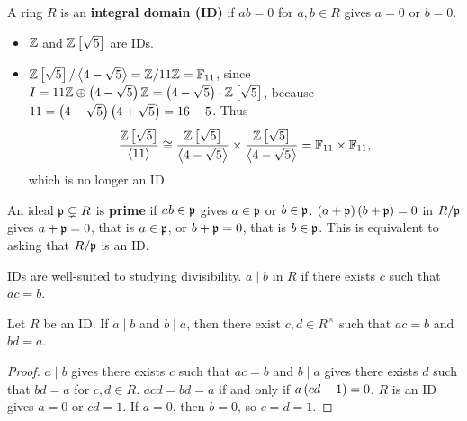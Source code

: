 
\begin{definition}
A ring $ R $ is an \textbf{integral domain (ID)} if $ ab = 0 $ for $ a, b \in R $ gives $ a = 0 $ or $ b = 0 $.
\end{definition}

\begin{example*}
\hfill
\begin{itemize}
\item $ \mathbb{Z} $ and $ \mathbb{Z}\left[ \sqrt{5} \right] $ are IDs.
\item $ \mathbb{Z}\left[ \sqrt{5} \right] / \left\langle 4 - \sqrt{5} \right\rangle = \mathbb{Z} / 11\mathbb{Z} = \mathbb{F}_{11} $, since $ I = 11\mathbb{Z} \oplus \left( 4 - \sqrt{5} \right)\mathbb{Z} = \left( 4 - \sqrt{5} \right) \cdot \mathbb{Z}\left[ \sqrt{5} \right] $, because $ 11 = \left( 4 - \sqrt{5} \right)\left( 4 + \sqrt{5} \right) = 16 - 5 $. Thus
$$ \dfrac{\mathbb{Z}\left[ \sqrt{5} \right]}{\left\langle 11 \right\rangle} \cong \dfrac{\mathbb{Z}\left[ \sqrt{5} \right]}{\left\langle 4 - \sqrt{5} \right\rangle} \times \dfrac{\mathbb{Z}\left[ \sqrt{5} \right]}{\left\langle 4 - \sqrt{5} \right\rangle} = \mathbb{F}_{11} \times \mathbb{F}_{11}, $$
which is no longer an ID.
\end{itemize}
\end{example*}

\begin{remark*}
An ideal $ \mathfrak{p} \subsetneq R $ is \textbf{prime} if $ ab \in \mathfrak{p} $ gives $ a \in \mathfrak{p} $ or $ b \in \mathfrak{p} $. $ \left( a + \mathfrak{p} \right)\left( b + \mathfrak{p} \right) = 0 $ in $ R / \mathfrak{p} $ gives $ a + \mathfrak{p} = 0 $, that is $ a \in \mathfrak{p} $, or $ b + \mathfrak{p} = 0 $, that is $ b \in \mathfrak{p} $. This is equivalent to asking that $ R / \mathfrak{p} $ is an ID.
\end{remark*}

IDs are well-suited to studying divisibility. $ a \mid b $ in $ R $ if there exists $ c $ such that $ ac = b $.

\begin{lemma}
Let $ R $ be an ID. If $ a \mid b $ and $ b \mid a $, then there exist $ c, d \in R^\times $ such that $ ac = b $ and $ bd = a $.
\end{lemma}

\begin{proof}
$ a \mid b $ gives there exists $ c $ such that $ ac = b $ and $ b \mid a $ gives there exists $ d $ such that $ bd = a $ for $ c, d \in R $. $ acd = bd = a $ if and only if $ a\left( cd - 1 \right) = 0 $. $ R $ is an ID gives $ a = 0 $ or $ cd = 1 $. If $ a = 0 $, then $ b = 0 $, so $ c = d = 1 $.
\end{proof}


